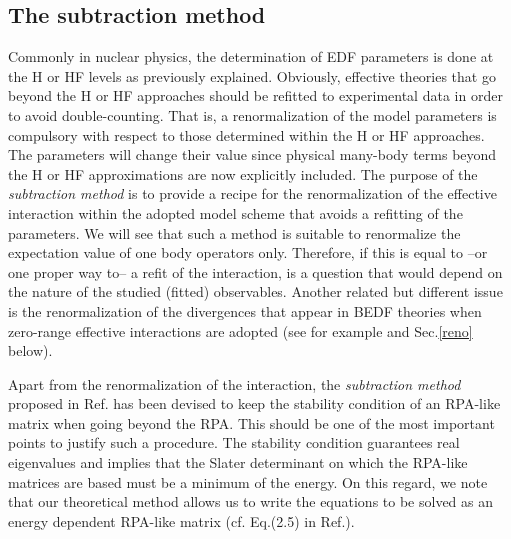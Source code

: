 \documentclass[12pt,a4paper,final]{iopart}
\newcommand{\gre}[1]{\textcolor[rgb]{0.0,0.6,0.0}{#1}}
\begin{document}
\subsection{The subtraction method}
\label{subtraction}

Commonly in nuclear physics, the determination of EDF parameters is done at the H or HF levels as previously explained. Obviously, effective theories that go beyond the H or HF approaches should be refitted to experimental data in order to avoid double-counting. That is, a renormalization of the model parameters is compulsory with respect to those determined within the H or HF approaches. The parameters will change their value since physical many-body terms beyond the H or HF approximations are now explicitly included. The purpose of the {\it subtraction method} \cite{tselyaev2007, tselyaev2013} is to provide a recipe for the renormalization of the effective interaction within the adopted model scheme that avoids a refitting of the parameters. We will see that such a method is suitable to renormalize the expectation value of one body operators only. Therefore, if this is equal to --or one proper way to-- a refit of the interaction, is a question that would depend on the nature of the studied (fitted) observables. Another related but different issue is the renormalization of the divergences that appear in BEDF theories when zero-range effective interactions are adopted (see for example \cite{moghrabi2010,brenna2014} and Sec.\ref{reno} below). 

Apart from the renormalization of the interaction, the {\it subtraction method} proposed in Ref.\cite{tselyaev2013} has been devised to keep the stability condition of an RPA-like matrix when going beyond the RPA. This should be one of the most important points to justify such a procedure. The stability condition guarantees real eigenvalues and implies that the Slater determinant on which the RPA-like matrices are based must be a minimum of the energy. On this regard, we note that our theoretical method allows us to write the equations to be solved as an energy dependent RPA-like matrix (cf. Eq.(2.5) in Ref.\cite{colo1994}).  

\end{document}

